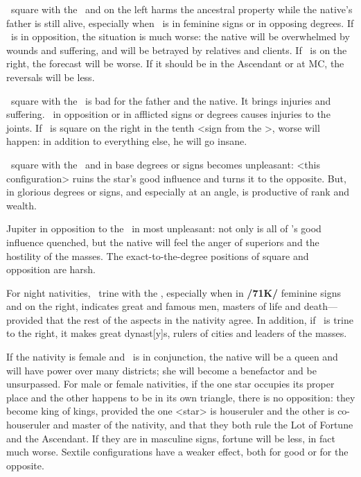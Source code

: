 \Saturn\, \marginnote{\Saturn \Square \Sun} square with the \Sun\, and on the left harms the ancestral property while the native’s father is still alive, especially when \Saturn\, is in feminine signs or in opposing degrees. If \Saturn\, is in opposition, the situation is much worse: the native will be overwhelmed by wounds and suffering, and will be betrayed by relatives and clients. If \Saturn\, is on the right, the forecast will be worse. If it should be in the Ascendant or at MC, the reversals will be less.

\Mars\, \marginnote{\Mars \Square \Sun} square with the \Sun\, is bad for the father and the native. It brings injuries and suffering. \Mars\, in opposition or in afflicted signs or degrees causes injuries to the joints. If \Mars\, is square on the right in the tenth <sign from the \Sun>, worse will happen: in addition to everything else, he will go insane.

\Jupiter\, \marginnote{\Jupiter \Square \Sun} square with the \Sun\, and in base degrees or signs becomes unpleasant: <this configuration> ruins the star’s good influence and turns it to the opposite. But, \Jupiter\, in glorious degrees or signs, and especially at an angle, is productive of rank and wealth. 

Jupiter \marginnote{\Jupiter \Opposition \Sun} in opposition to the \Sun\, in most unpleasant: not only is all of \Jupiter’s good influence quenched, but the native will feel the anger of superiors and the hostility of the masses. The \mndl exact-to-the-degree positions of square and opposition are
harsh.

For night nativities, \Mars\, \marginnote{\Mars \Trine \Sun} trine with the \Sun, especially when in \textbf{/71K/} feminine signs and on the right, indicates great and famous men, masters of life and death—provided that the rest of the aspects in the nativity agree. In addition, if \Jupiter\, is trine to the right, it makes great dynast[y]s, rulers of cities and leaders of the masses. 

If the nativity is female and \Venus\, is in conjunction, the native will be a queen and will have power over many districts; she will become a benefactor and be unsurpassed. For male or female nativities, if the one star occupies its proper place and the other happens to be in its own triangle, there is no opposition: they become king of kings, provided the one <star> is houseruler and the other is co-houseruler and master of the nativity, and that they both rule the Lot of Fortune and the Ascendant. If they are in masculine signs, fortune will be less, in fact much worse.  Sextile \mndl configurations have a weaker effect, both for good or for the opposite.

